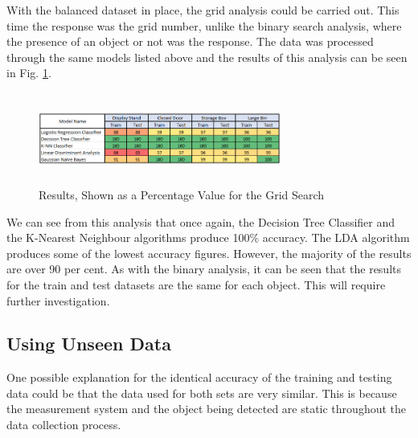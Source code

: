 \documentclass[conference]{IEEEtran}
\begin{document}


With the balanced dataset in place, the grid analysis could be carried out. This time the response was the grid number, unlike the binary search analysis, where the presence of an object or not was the response. The data was processed through the same models listed above and the results of this analysis can be seen in Fig. \ref{fig:initial_analysis_gridsearch}.

\begin{figure}[ht]
\includegraphics[width=8cm, height=3cm]{images/initial_analysis_gridsearch.png}
\centering
\caption{Results, Shown as a Percentage Value for the Grid Search}
\label{fig:initial_analysis_gridsearch}
\end{figure}

We can see from this analysis that once again, the Decision Tree Classifier and the K-Nearest Neighbour algorithms produce 100\% accuracy.  The LDA algorithm produces some of the lowest accuracy figures. However, the majority of the results are over 90 per cent. As with the binary analysis, it can be seen that the results for the train and test datasets are the same for each object. This will require further investigation.

\subsection{Using Unseen Data}
One possible explanation for the identical accuracy of the training and testing data could be that the data used for both sets are very similar. This is because the measurement system and the object being detected are static throughout the data collection process. 
\end{document}
